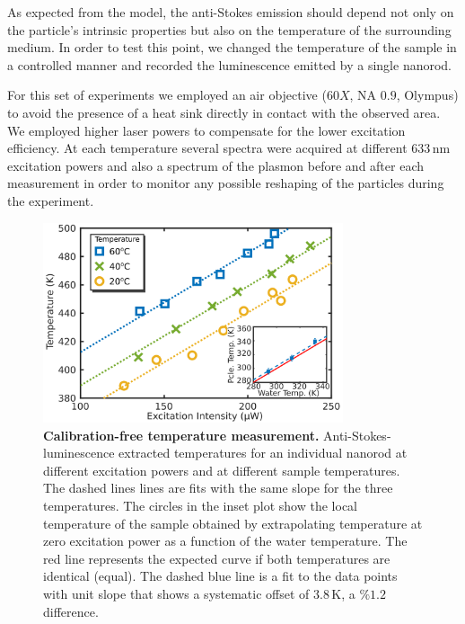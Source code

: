 \documentclass[journal=nalefd,manuscript=letter]{achemso}
\newcommand{\K}{\ensuremath{\,\textrm{K}}}
\newcommand{\nm}{\ensuremath{\,\textrm{nm}}}
\begin{document}
As expected from the model, the anti-Stokes emission should depend not only on
the particle's intrinsic properties but also on the temperature of the
surrounding medium\cite{Konrad2013}. In order to test this point, we changed the
temperature of the sample in a controlled manner and recorded the luminescence
emitted by a single nanorod.

For this set of experiments we employed an air objective ($60X$, NA $0.9$,
Olympus) to avoid the presence of a heat sink directly in contact with the
observed area. We employed higher laser powers to compensate for the lower
excitation efficiency. At each temperature several spectra were acquired at different
$633\nm$ excitation powers and also a spectrum of the plasmon before and after
each measurement in order to monitor any possible reshaping of the particles
during the experiment.

\begin{figure}[tp] \centering
\includegraphics[width=88.4mm]{Figures/03_Fit_Of_AS/03_Log_Fit_AS_02.png}
\caption{\textbf{Calibration-free temperature measurement.}
Anti-Stokes-luminescence extracted temperatures for an individual nanorod
at different excitation powers and at different sample temperatures. 
The dashed lines lines are fits with the same slope for the three temperatures. 
The circles in the inset plot show the local temperature of the sample obtained
by extrapolating temperature at zero excitation power as a function of the water temperature.
The red line represents the expected curve if both temperatures are identical (equal). The dashed blue
line is a fit to the data points with unit slope that shows a systematic offset of $3.8\K$, a $\%1.2$ difference.}
	\label{fig:AS_temp}
\end{figure}

\end{document}
